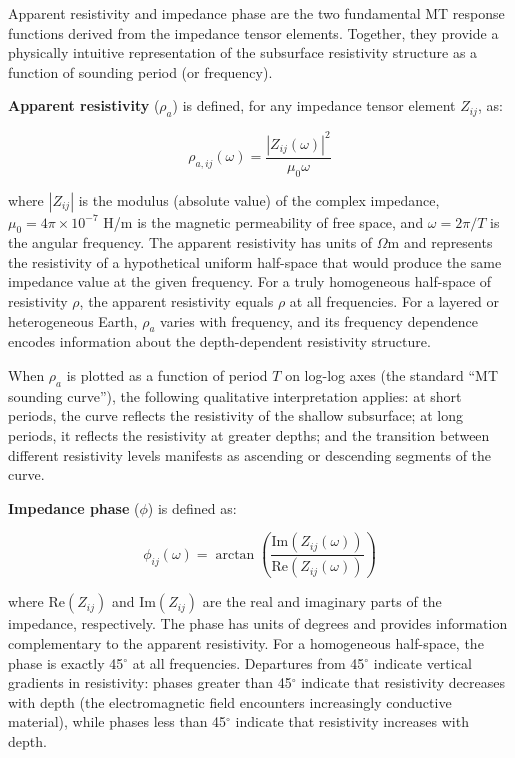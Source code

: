 Apparent resistivity and impedance phase are the two fundamental MT response functions derived from the impedance tensor elements. Together, they provide a physically intuitive representation of the subsurface resistivity structure as a function of sounding period (or frequency).

\textbf{Apparent resistivity} ($\rho_a$) is defined, for any impedance tensor element $Z_{ij}$, as:

\begin{equation}
\rho_{a,ij}(\omega) = \frac{|Z_{ij}(\omega)|^2}{\mu_0 \omega}
\end{equation}

\noindent where $|Z_{ij}|$ is the modulus (absolute value) of the complex impedance, $\mu_0 = 4\pi \times 10^{-7}$ H/m is the magnetic permeability of free space, and $\omega = 2\pi/T$ is the angular frequency. The apparent resistivity has units of $\Omega$m and represents the resistivity of a hypothetical uniform half-space that would produce the same impedance value at the given frequency. For a truly homogeneous half-space of resistivity $\rho$, the apparent resistivity equals $\rho$ at all frequencies. For a layered or heterogeneous Earth, $\rho_a$ varies with frequency, and its frequency dependence encodes information about the depth-dependent resistivity structure.

When $\rho_a$ is plotted as a function of period $T$ on log-log axes (the standard ``MT sounding curve''), the following qualitative interpretation applies: at short periods, the curve reflects the resistivity of the shallow subsurface; at long periods, it reflects the resistivity at greater depths; and the transition between different resistivity levels manifests as ascending or descending segments of the curve.

\textbf{Impedance phase} ($\phi$) is defined as:

\begin{equation}
\phi_{ij}(\omega) = \arctan\left(\frac{\text{Im}(Z_{ij}(\omega))}{\text{Re}(Z_{ij}(\omega))}\right)
\end{equation}

\noindent where $\text{Re}(Z_{ij})$ and $\text{Im}(Z_{ij})$ are the real and imaginary parts of the impedance, respectively. The phase has units of degrees and provides information complementary to the apparent resistivity. For a homogeneous half-space, the phase is exactly 45$^\circ$ at all frequencies. Departures from 45$^\circ$ indicate vertical gradients in resistivity: phases greater than 45$^\circ$ indicate that resistivity decreases with depth (the electromagnetic field encounters increasingly conductive material), while phases less than 45$^\circ$ indicate that resistivity increases with depth.

